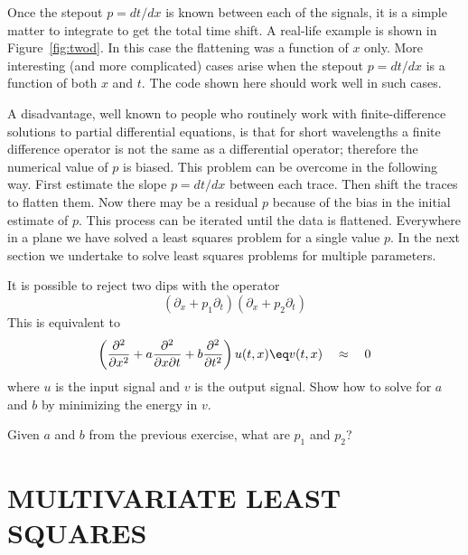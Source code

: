\par
Once the stepout $p = d t /d x$ is known between each of the signals, it is a simple matter to integrate to get the total time shift.  A real-life example is shown in Figure~\ref{fig:twod}.
%
%
In this case the flattening was a function of $x$ only.  More interesting (and more complicated) cases arise when the stepout $p = d t /d x$ is a function of both $x$ and $t$.  The code shown here should work well in such cases.
\par
A disadvantage, well known to people who routinely work with finite-difference solutions to partial differential equations, is that for short wavelengths a finite difference operator is not the same as a differential operator; therefore the numerical value of $p$ is biased.  This problem can be overcome in the following way.  First estimate the slope $p= d t /d x$ between each trace. Then shift the traces to flatten them.  Now there may be a residual $p$ because of the bias in the initial estimate of $p$.  This process can be iterated until the data is flattened.  Everywhere in a plane we have solved a least squares problem for a single value $p$.  In the next section we undertake to solve least squares problems for multiple parameters. 
\begin{exer}
\item It is possible to reject two dips with the operator
\begin{equation}
(\partial_x + p_1 \partial_t)(\partial_x + p_2 \partial_t)
\end{equation}
This is equivalent to
\begin{equation}
\left(
\frac{\partial^2}{\partial x^2} + a \frac{\partial^2}{\partial x \partial t} + b \frac{\partial^2}{\partial t^2} 
\right)
u(t,x) \eq v(t,x) \quad \approx \quad 0
\end{equation}
where $u$ is the input signal and $v$ is the output signal.  Show how to solve for $a$ and $b$ by minimizing the energy in $v$.
\item Given $a$ and $b$ from the previous exercise, what are $p_1$ and $p_2$?
\end{exer}
	
	
\section{MULTIVARIATE LEAST SQUARES}

